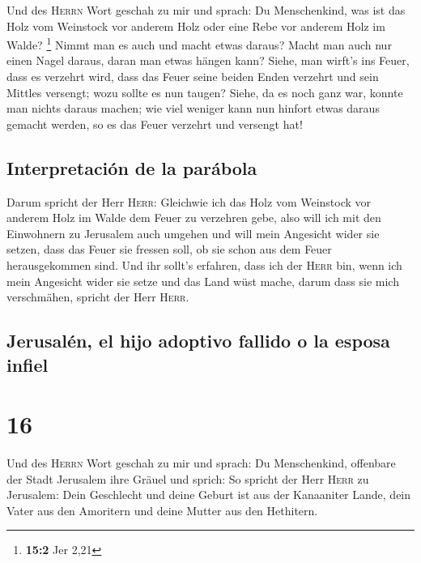  Und des \textsc{Herrn} Wort geschah zu mir und sprach:
 Du Menschenkind, was ist das Holz vom Weinstock vor
anderem Holz oder eine Rebe vor anderem Holz im Walde? \footnote{\textbf{15:2}
  Jer 2,21}  Nimmt man es auch und macht etwas daraus?
Macht man auch nur einen Nagel daraus, daran man etwas hängen kann?
 Siehe, man wirft's ins Feuer, dass es verzehrt wird, dass
das Feuer seine beiden Enden verzehrt und sein Mittles versengt; wozu
sollte es nun taugen?  Siehe, da es noch ganz war, konnte
man nichts daraus machen; wie viel weniger kann nun hinfort etwas daraus
gemacht werden, so es das Feuer verzehrt und versengt hat!

\hypertarget{interpretaciuxf3n-de-la-paruxe1bola}{%
\subsection{Interpretación de la
parábola}\label{interpretaciuxf3n-de-la-paruxe1bola}}

 Darum spricht der Herr \textsc{Herr}: Gleichwie ich das
Holz vom Weinstock vor anderem Holz im Walde dem Feuer zu verzehren
gebe, also will ich mit den Einwohnern zu Jerusalem auch umgehen
 und will mein Angesicht wider sie setzen, dass das Feuer
sie fressen soll, ob sie schon aus dem Feuer herausgekommen sind. Und
ihr sollt's erfahren, dass ich der \textsc{Herr} bin, wenn ich mein
Angesicht wider sie setze  und das Land wüst mache, darum
dass sie mich verschmähen, spricht der Herr \textsc{Herr}.

\hypertarget{jerusaluxe9n-el-hijo-adoptivo-fallido-o-la-esposa-infiel}{%
\subsection{Jerusalén, el hijo adoptivo fallido o la esposa
infiel}\label{jerusaluxe9n-el-hijo-adoptivo-fallido-o-la-esposa-infiel}}

\hypertarget{section-15}{%
\section{16}\label{section-15}}

 Und des \textsc{Herrn} Wort geschah zu mir und sprach:
 Du Menschenkind, offenbare der Stadt Jerusalem ihre
Gräuel und sprich:  So spricht der Herr \textsc{Herr} zu
Jerusalem: Dein Geschlecht und deine Geburt ist aus der Kanaaniter
Lande, dein Vater aus den Amoritern und deine Mutter aus den Hethitern.

